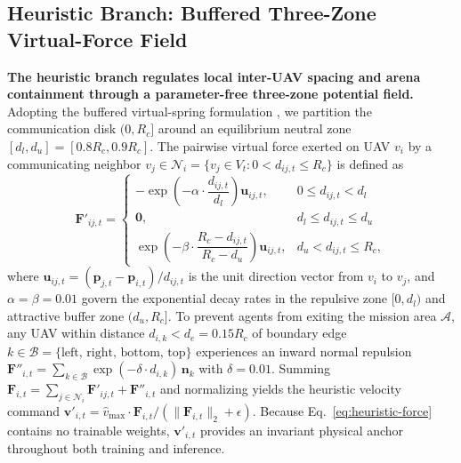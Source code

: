 \documentclass[11pt]{article}
\theoremstyle{plain}
\theoremstyle{definition}
\theoremstyle{remark}
\begin{document}
\subsection{Heuristic Branch: Buffered Three-Zone Virtual-Force Field}
\label{sec:heuristic-branch}
\textbf{The heuristic branch regulates local inter-UAV spacing and arena containment through a parameter-free three-zone potential field.} Adopting the buffered virtual-spring formulation \citep{rychlewski1984hooke,peng2026r2c}, we partition the communication disk $(0, R_c]$ around an equilibrium neutral zone $[d_l, d_u] = [0.8 R_c, 0.9 R_c]$. The pairwise virtual force exerted on UAV $v_i$ by a communicating neighbor $v_j \in \mathcal{N}_i = \{v_j \in V_t : 0 < d_{ij,t} \le R_c\}$ is defined as
\begin{equation}
  \mathbf{F}'_{ij,t} =
  \begin{cases}
    -\exp\!\left(-\alpha \cdot \dfrac{d_{ij,t}}{d_l}\right) \mathbf{u}_{ij,t}, & 0 \le d_{ij,t} < d_l \\[6pt]
    \mathbf{0}, & d_l \le d_{ij,t} \le d_u \\[4pt]
    \exp\!\left(-\beta \cdot \dfrac{R_c - d_{ij,t}}{R_c - d_u}\right) \mathbf{u}_{ij,t}, & d_u < d_{ij,t} \le R_c,
  \end{cases}
  \label{eq:heuristic-force}
\end{equation}
where $\mathbf{u}_{ij,t} = (\mathbf{p}_{j,t} - \mathbf{p}_{i,t}) / d_{ij,t}$ is the unit direction vector from $v_i$ to $v_j$, and $\alpha = \beta = 0.01$ govern the exponential decay rates in the repulsive zone $[0, d_l)$ and attractive buffer zone $(d_u, R_c]$. To prevent agents from exiting the mission area $\mathcal{A}$, any UAV within distance $d_{i,k} < d_e = 0.15 R_c$ of boundary edge $k \in \mathcal{B} = \{\text{left, right, bottom, top}\}$ experiences an inward normal repulsion $\mathbf{F}''_{i,t} = \sum_{k \in \mathcal{B}} \exp(-\delta \cdot d_{i,k})\,\mathbf{n}_k$ with $\delta = 0.01$. Summing $\mathbf{F}_{i,t} = \sum_{j \in \mathcal{N}_i} \mathbf{F}'_{ij,t} + \mathbf{F}''_{i,t}$ and normalizing yields the heuristic velocity command $\mathbf{v}'_{i,t} = \hat{v}_{\max} \cdot \mathbf{F}_{i,t} / (\|\mathbf{F}_{i,t}\|_2 + \epsilon)$. Because Eq.~\eqref{eq:heuristic-force} contains no trainable weights, $\mathbf{v}'_{i,t}$ provides an invariant physical anchor throughout both training and inference.
\end{document}
